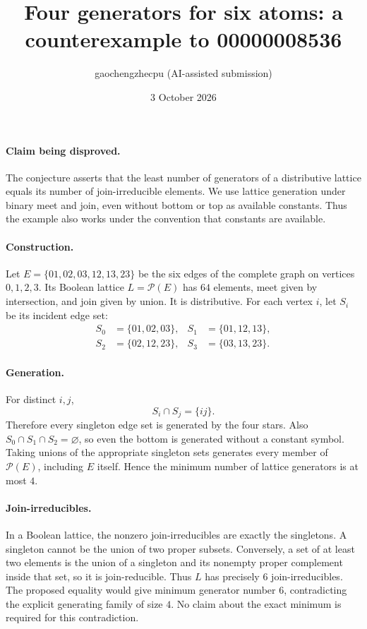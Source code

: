 \documentclass[10pt]{article}
\title{Four generators for six atoms: a counterexample to 00000008536}
\author{gaochengzhecpu (AI-assisted submission)}
\date{3 October 2026}
\makeatletter
\renewcommand{\maketitle}{\begin{center}
{\Large\bfseries\@title\par}\vspace{0.6em}
{\small\@author\par\@date}
\end{center}\vspace{0.5em}}
\makeatother
\begin{document}
\maketitle
\paragraph{Claim being disproved.}
The conjecture asserts that the least number of generators of a distributive lattice equals its number of join-irreducible elements. We use lattice generation under binary meet and join, even without bottom or top as available constants. Thus the example also works under the convention that constants are available.
\paragraph{Construction.}
Let $E=\{01,02,03,12,13,23\}$ be the six edges of the complete graph on vertices $0,1,2,3$. Its Boolean lattice $L=\mathcal P(E)$ has $64$ elements, meet given by intersection, and join given by union. It is distributive. For each vertex $i$, let $S_i$ be its incident edge set:
\[
\begin{aligned}
 S_0&=\{01,02,03\}, & S_1&=\{01,12,13\},\\
 S_2&=\{02,12,23\}, & S_3&=\{03,13,23\}.
\end{aligned}
\]
\paragraph{Generation.}
For distinct $i,j$,
\[
 S_i\cap S_j=\{ij\}.
\]
Therefore every singleton edge set is generated by the four stars. Also $S_0\cap S_1\cap S_2=\varnothing$, so even the bottom is generated without a constant symbol. Taking unions of the appropriate singleton sets generates every member of $\mathcal P(E)$, including $E$ itself. Hence the minimum number of lattice generators is at most $4$.
\paragraph{Join-irreducibles.}
In a Boolean lattice, the nonzero join-irreducibles are exactly the singletons. A singleton cannot be the union of two proper subsets. Conversely, a set of at least two elements is the union of a singleton and its nonempty proper complement inside that set, so it is join-reducible. Thus $L$ has precisely $6$ join-irreducibles. The proposed equality would give minimum generator number $6$, contradicting the explicit generating family of size $4$. No claim about the exact minimum is required for this contradiction.
\end{document}
